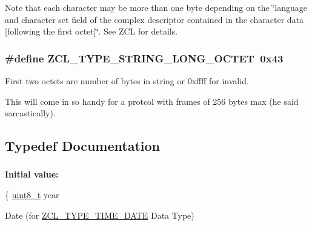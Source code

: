 Note that each character may be more than one byte depending on the \char`\"{}language and character set field of the complex descriptor contained
in the character data \mbox{[}following the first octet\mbox{]}\char`\"{}. See Z\-C\-L for details. \hypertarget{group__zcl__types_ga567563a365e2dddaced101de02fd9128}{
\subsubsection[{Z\-C\-L\-\_\-\-T\-Y\-P\-E\-\_\-\-S\-T\-R\-I\-N\-G\-\_\-\-L\-O\-N\-G\-\_\-\-O\-C\-T\-E\-T}]{\setlength{\rightskip}{0pt plus 5cm}\#define Z\-C\-L\-\_\-\-T\-Y\-P\-E\-\_\-\-S\-T\-R\-I\-N\-G\-\_\-\-L\-O\-N\-G\-\_\-\-O\-C\-T\-E\-T~0x43}}\label{group__zcl__types_ga567563a365e2dddaced101de02fd9128}


First two octets are number of bytes in string or 0xffff for invalid. 

This will come in so handy for a protcol with frames of 256 bytes max (he said sarcastically). 

\subsection{Typedef Documentation}
\hypertarget{group__zcl__types_ga9ea8f9ebe25e922be76329748b8398b5}{
\subsubsection[{zcl\-\_\-date\-\_\-t}]{}}\label{group__zcl__types_ga9ea8f9ebe25e922be76329748b8398b5}
{\bfseries Initial value\-:}
\begin{DoxyCode}
\{
   \hyperlink{group__hal_gae1affc9ca37cfb624959c866a73f83c2}{uint8\_t} year
\end{DoxyCode}


Date (for \hyperlink{group__zcl__types_gad5552b0825d941f0ccd7b1d797dc091b}{Z\-C\-L\-\_\-\-T\-Y\-P\-E\-\_\-\-T\-I\-M\-E\-\_\-\-D\-A\-T\-E} Data Type) 

